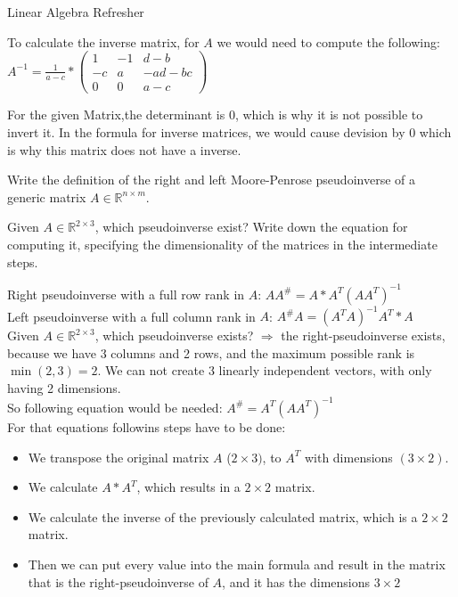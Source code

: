 \documentclass[
	english,
        solution=true
	]{tudaexercise}
\newcommand{\R}{\mathbb{R}}
\begin{document}
\begin{task}[points=28]{Linear Algebra Refresher}
\begin{subtask}[points=7,title=Matrix Inversion]
\begin{solution}
To calculate the inverse matrix, for $A$ we would need to compute the following: $A^{-1}=\frac{1}{a-c}*\begin{pmatrix}
    1 & -1 & d-b\\-c & a & -ad-bc \\ 0 & 0 & a-c
\end{pmatrix}$

For the given Matrix,the determinant is $0$, which is why it is not possible to invert it. In the formula for inverse matrices, we would cause devision by $0$ which is why this matrix does not have a inverse.

\end{solution}
\end{subtask}


\begin{subtask}[points=3,title=Matrix Pseudoinverse]

Write the definition of the right and left Moore-Penrose pseudoinverse of a generic matrix $A \in \R^{n\times m}$.

Given $A \in \R^{2 \times 3}$, which pseudoinverse exist? Write down the equation for computing it, specifying the dimensionality of the matrices in the intermediate steps.

\begin{solution}

Right pseudoinverse with a full row rank in $A$: $AA^\#=A*A^T(AA^T)^{-1}$\\

Left pseudoinverse with a full column rank in $A$: $A^\#A=(A^TA)^{-1}A^T*A$\\

Given $A\in \R^{2\times 3}$, which pseudoinverse exists? $\Rightarrow $ the right-pseudoinverse exists, because we have 3 columns and 2 rows, and the maximum possible rank is $\min(2, 3)=2$. We can not create 3 linearly independent vectors, with only having 2 dimensions.\\

So following equation would be needed: $A^\# = A^T(AA^T)^{-1}$\\
For that equations followins steps have to be done:
\begin{itemize}
    \item We transpose the original matrix $A$ ($2\times 3)$, to $A^T$ with dimensions $(3\times 2)$.
    \item We calculate $A * A^T$, which results in a $2\times 2$ matrix.
    \item We calculate the inverse of the previously calculated matrix, which is a $2 \times 2$ matrix.
    \item Then we can put every value into the main formula and result in the matrix that is the right-pseudoinverse of $A$, and it has the dimensions $3\times 2$
\end{itemize}
\end{solution}
\end{subtask}


\end{task}
\end{document}
